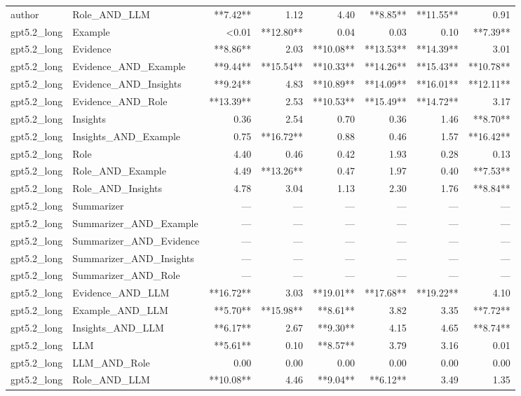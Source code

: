 \begin{tabular}{llrrrrrr}
author & Role_AND_LLM & **7.42** & 1.12 & 4.40 & **8.85** & **11.55** & 0.91 \\
gpt5.2_long & Example & <0.01 & **12.80** & 0.04 & 0.03 & 0.10 & **7.39** \\
gpt5.2_long & Evidence & **8.86** & 2.03 & **10.08** & **13.53** & **14.39** & 3.01 \\
gpt5.2_long & Evidence_AND_Example & **9.44** & **15.54** & **10.33** & **14.26** & **15.43** & **10.78** \\
gpt5.2_long & Evidence_AND_Insights & **9.24** & 4.83 & **10.89** & **14.09** & **16.01** & **12.11** \\
gpt5.2_long & Evidence_AND_Role & **13.39** & 2.53 & **10.53** & **15.49** & **14.72** & 3.17 \\
gpt5.2_long & Insights & 0.36 & 2.54 & 0.70 & 0.36 & 1.46 & **8.70** \\
gpt5.2_long & Insights_AND_Example & 0.75 & **16.72** & 0.88 & 0.46 & 1.57 & **16.42** \\
gpt5.2_long & Role & 4.40 & 0.46 & 0.42 & 1.93 & 0.28 & 0.13 \\
gpt5.2_long & Role_AND_Example & 4.49 & **13.26** & 0.47 & 1.97 & 0.40 & **7.53** \\
gpt5.2_long & Role_AND_Insights & 4.78 & 3.04 & 1.13 & 2.30 & 1.76 & **8.84** \\
gpt5.2_long & Summarizer & — & — & — & — & — & — \\
gpt5.2_long & Summarizer_AND_Example & — & — & — & — & — & — \\
gpt5.2_long & Summarizer_AND_Evidence & — & — & — & — & — & — \\
gpt5.2_long & Summarizer_AND_Insights & — & — & — & — & — & — \\
gpt5.2_long & Summarizer_AND_Role & — & — & — & — & — & — \\
gpt5.2_long & Evidence_AND_LLM & **16.72** & 3.03 & **19.01** & **17.68** & **19.22** & 4.10 \\
gpt5.2_long & Example_AND_LLM & **5.70** & **15.98** & **8.61** & 3.82 & 3.35 & **7.72** \\
gpt5.2_long & Insights_AND_LLM & **6.17** & 2.67 & **9.30** & 4.15 & 4.65 & **8.74** \\
gpt5.2_long & LLM & **5.61** & 0.10 & **8.57** & 3.79 & 3.16 & 0.01 \\
gpt5.2_long & LLM_AND_Role & 0.00 & 0.00 & 0.00 & 0.00 & 0.00 & 0.00 \\
gpt5.2_long & Role_AND_LLM & **10.08** & 4.46 & **9.04** & **6.12** & 3.49 & 1.35 \\

\end{tabular}
